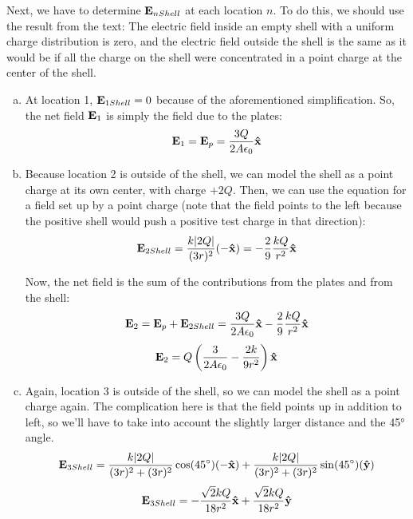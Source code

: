\documentclass{article}
\begin{document}
Next, we have to determine $\vb{E}_{nShell}$ at each location $n$. To do this, we should use the result from the text: The electric field inside an empty shell with a uniform charge distribution is zero, and the electric field outside the shell is the same as it would be if all the charge on the shell were concentrated in a point charge at the center of the shell.

\begin{enumerate}[(a)]
    \item At location 1, $\vb{E}_{1Shell} = 0$ because of the aforementioned simplification. So, the net field $\vb{E}_1$ is simply the field due to the plates:
    \begin{equation}
    \vb{E}_1 = \vb{E}_p = \frac{3Q}{2A\epsilon_0}\vu{x}
    \end{equation}

    \item Because location 2 is outside of the shell, we can model the shell as a point charge at its own center, with charge $+2Q$. Then, we can use the equation for a field set up by a point charge (note that the field points to the left because the positive shell would push a positive test charge in that direction):
    \begin{equation}
    \vb{E}_{2Shell} = \frac{k|2Q|}{(3r)^2}(-\vu{x}) = - \frac{2}{9} \frac{kQ}{r^2} \vu{x}
    \end{equation}

    Now, the net field is the sum of the contributions from the plates and from the shell:
    \begin{equation*}
    \vb{E}_2 = \vb{E}_p + \vb{E}_{2Shell} = \frac{3Q}{2A\epsilon_0}\vu{x} - \frac{2}{9} \frac{kQ}{r^2} \vu{x}
    \end{equation*}
    \begin{equation}
    \vb{E}_2 = Q\left(\frac{3}{2A\epsilon_0} - \frac{2k}{9r^2}\right)\vu{x}
    \end{equation}

    \item Again, location 3 is outside of the shell, so we can model the shell as a point charge again. The complication here is that the field points up in addition to left, so we'll have to take into account the slightly larger distance and the 45° angle.
    \begin{equation*}
    \vb{E}_{3Shell} = \frac{k|2Q|}{(3r)^2 + (3r)^2}\cos(45^{\circ})(-\vu{x}) + \frac{k|2Q|}{(3r)^2 + (3r)^2}\sin(45^{\circ})(\vu{y})
    \end{equation*}
    \begin{equation}
    \vb{E}_{3Shell} = -\frac{\sqrt{2}kQ}{18r^2}\vu{x} + \frac{\sqrt{2}kQ}{18r^2}\vu{y}
    \end{equation}


\end{enumerate}
\end{document}
